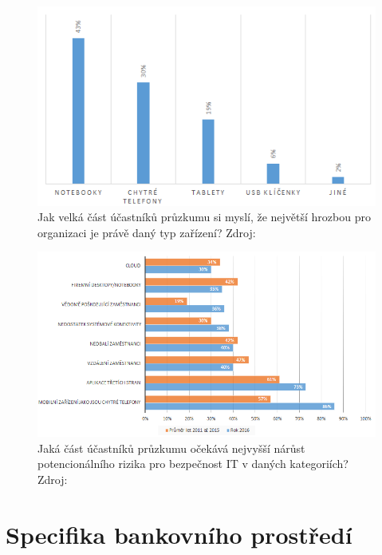 \begin{figure}[h!]\label{hrozbyZarizeni}
\centering
\includegraphics[width=12cm]{img/hrozbyZarizeni}
\caption{Jak velká část účastníků průzkumu si myslí, že největší hrozbou pro organizaci je právě daný typ zařízení? Zdroj: } 
\end{figure}



\begin{figure}[h!]\label{hrozbyDuvody}
\centering
\includegraphics[width=13cm]{img/hrozbyDuvody}
\caption{Jaká část účastníků průzkumu očekává nejvyšší nárůst potencionálního rizika pro bezpečnost IT v daných kategoriích? Zdroj: } 
\end{figure}





\section{Specifika bankovního prostředí}
